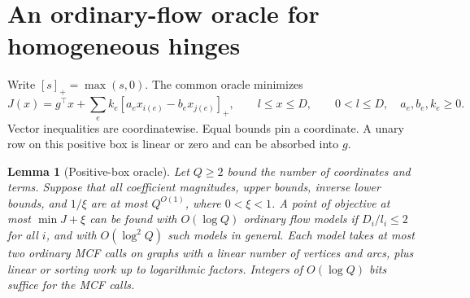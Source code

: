 \documentclass[11pt,letterpaper]{article}
\newtheorem{lemma}[theorem]{Lemma}
\begin{document}
\section{An ordinary-flow oracle for homogeneous hinges}\label{sec:hinge}
Write $[s]_+=\max(s,0)$. The common oracle minimizes
\[
 J(x)=g^\top x+\sum_e k_e[a_e x_{i(e)}-b_e x_{j(e)}]_+,
 \qquad l\le x\le D,\qquad 0<l\le D,
 \quad a_e,b_e,k_e\ge0.
\]
Vector inequalities are coordinatewise. Equal bounds pin a coordinate. A unary
row on this positive box is linear or zero and can be absorbed into $g$.
\begin{lemma}[Positive-box oracle]\label{lem:hinge}
Let $Q\ge 2$ bound the number of coordinates and terms. Suppose that all
coefficient magnitudes, upper bounds, inverse lower bounds, and $1/\xi$
are at most $Q^{O(1)}$, where $0<\xi<1$. A point of objective at most
$\min J+\xi$ can be found with $O(\log Q)$ ordinary flow models if
$D_i/l_i\le2$ for all $i$, and with $O(\log^2 Q)$ such models in general.
Each model takes at most two ordinary MCF calls on graphs with a linear
number of vertices and arcs, plus linear or sorting work up to logarithmic
factors. Integers of $O(\log Q)$ bits suffice for the MCF calls.
\end{lemma}
\end{document}

